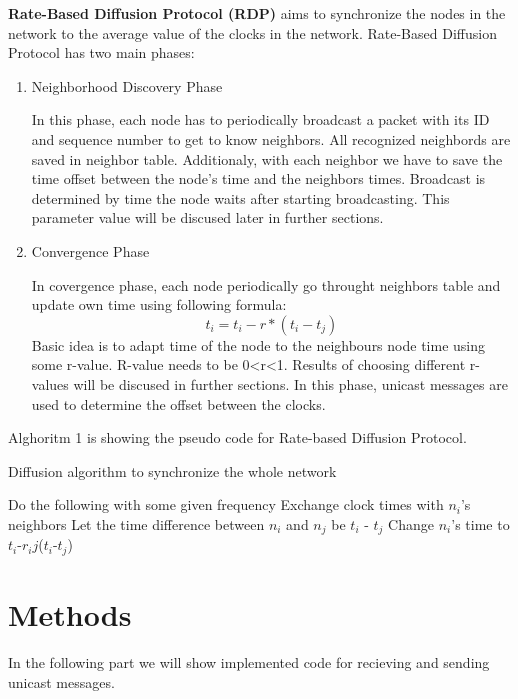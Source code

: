\documentclass{llncs}
\begin{document}
 \textbf{Rate-Based Diffusion Protocol (RDP)} aims to synchronize the nodes in the network to the average value of the clocks in the network.
Rate-Based Diffusion Protocol has two main phases:
\begin{enumerate}
\item  Neighborhood Discovery Phase

In this phase, each node has to periodically broadcast a packet with its ID and sequence number to get to know neighbors. All recognized neighbords are saved in neighbor table. Additionaly, with each neighbor we have to save the time offset between the node's time and the neighbors times. Broadcast is determined by time the node waits after starting broadcasting. This parameter value will be discused later in further sections. 

\item  Convergence Phase

In covergence phase, each node periodically go throught neighbors table and update own time using following formula:
\[t_i= t_i -  r * (t_i-t_j)\]
Basic idea is to adapt time of the node to the neighbours node time using some r-value.
R-value needs to be 0\textless r\textless 1. Results of choosing different r-values will be discused in further sections. 
In this phase, unicast messages are used to determine the offset between the clocks.  
\end{enumerate}
\pagebreak 
Alghoritm 1 is showing the pseudo code for Rate-based Diffusion Protocol. 
\begin{algorithm}
 \caption{Diffusion algorithm to synchronize the whole network}\label{euclid}
  \begin{algorithmic}[1]
    \STATE Do the following with some given frequency
     \STATE Exchange clock times with $n_i$'s neighbors
        \STATE Let the time difference between $n_i$ and $n_j$ be $t_i$ - $t_j$
        \STATE Change $n_i$'s time to $t_i$-$r_ij$($t_i$-$t_j$)
      \ENDFOR
    \ENDFOR
\end{algorithmic}
\end{algorithm}

\begin{comment}
Methods: especially, describe the methods used to realize the protocol
(functions in the code and their functionality).
\end{comment}
\section{Methods}
In the following part we will show implemented code for recieving and sending unicast messages. 
\end{document}
